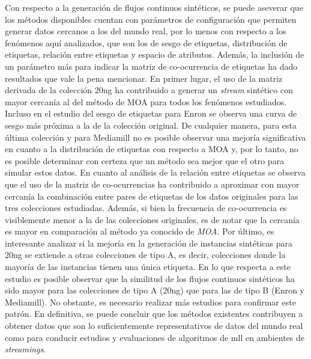 Con respecto a la generación de flujos continuos sintéticos, se puede aseverar
que los métodos disponibles cuentan con parámetros de configuración que permiten
generar datos cercanos a los del mundo real, por lo menos con respecto a los
fenómenos aquí analizados, que son los de sesgo de etiquetas, distribución
de etiquetas, relación entre etiquetas y espacio de atributos.  Además, la
inclusión de un parámetro más para indicar la matriz de co-ocurrencia de
etiquetas ha dado resultados que vale la pena mencionar. En primer lugar, el uso
de la matriz derivada de la colección 20ng ha contribuido a generar un
\textit{stream} sintético con mayor cercanía al del método de MOA para todos los
fenómenos estudiados. Incluso en el estudio del sesgo de etiquetas para Enron se
observa una curva de sesgo más próxima a la de la colección original. De
cualquier manera, para esta última colección y para Mediamill no es posible
observar una mejoría significativa en cuanto a la distribución de etiquetas con
respecto a MOA y, por lo tanto, no es posible determinar con certeza que un
método sea mejor que el otro para simular estos datos. En cuanto al análisis de
la relación entre etiquetas se observa que el uso de la matriz de co-ocurrencias
ha contribuido a aproximar con mayor cercanía la combinación entre pares de
etiquetas de los datos originales para las tres colecciones estudiadas. Además,
si bien la frecuencia de co-ocurrencia es visiblemente menor a la de las
colecciones originales, es de notar que la cercanía es mayor en comparación al
método ya conocido de \textit{MOA}\@. Por último, es interesante analizar si la
mejoría en la generación de instancias sintéticas para 20ng se extiende a otras
colecciones de tipo A, es decir, colecciones donde la mayoría de las instancias
tienen una única etiqueta. En lo que respecta a este estudio es posible observar
que la similitud de los flujos continuos sintéticos ha sido mayor para las
colecciones de tipo A (20ng) que para las de tipo B (Enron y Mediamill). No
obstante, es necesario realizar más estudios para confirmar este patrón.  En
definitiva, se puede concluir que los métodos existentes contribuyen a obtener
datos que son lo suficientemente representativos de datos del mundo real como
para conducir estudios y evaluaciones de algoritmos de \acrshort{mll} en
ambientes de \textit{streamings}.

